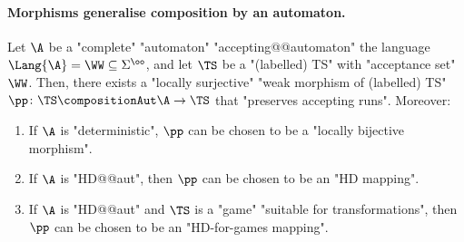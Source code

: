 \documentclass[10pt,a4paper]{amsart}
\renewcommand{\SS}{\Sigma}
\begin{document}
\paragraph*{Morphisms generalise composition by an automaton.}

\begin{proposition}\label{prop-morph:product-by-aut-induces-mapping}
	Let $\A$ be a "complete" "automaton" "accepting@@automaton" the language $\Lang{\A} = \WW\subseteq \SS^\oo$, and let $\TS$ be a "(labelled) TS" with "acceptance set" $\WW$. 
	Then, there exists a "locally surjective" "weak morphism of (labelled) TS" $\pp\colon \TS \compositionAut \A \to \TS$ that "preserves accepting runs". Moreover:
	\begin{enumerate}
		\item If $\A$ is "deterministic", $\pp$ can be chosen to be a "locally bijective morphism".
		\item If $\A$ is "HD@@aut", then $\pp$ can be chosen to be an "HD mapping".
		\item If $\A$ is "HD@@aut" and $\TS$ is a "game" "suitable for transformations", then $\pp$ can be chosen to be an "HD-for-games mapping".
	\end{enumerate}	
\end{proposition}
\end{document}
